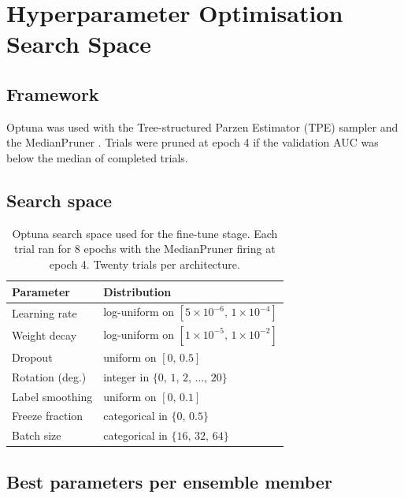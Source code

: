 \documentclass[../preamble.tex]{subfiles}
\begin{document}
\chapter{Hyperparameter Optimisation Search Space}
\label{app:hpo-search-space}

\section{Framework}
\label{app:hpo-framework}

Optuna was used with the Tree-structured Parzen Estimator (TPE) sampler and
the MedianPruner \cite{akiba2019}. Trials were pruned at epoch 4 if the
validation AUC was below the median of completed trials.

\section{Search space}
\label{app:hpo-space}

\begin{table}[htbp]
  \centering
  \small
  \caption{Optuna search space used for the fine-tune stage. Each trial ran
           for 8 epochs with the MedianPruner firing at epoch 4. Twenty trials
           per architecture.}
  \label{tab:hpo-space}
  \begin{tabular}{ll}
    \toprule
    \textbf{Parameter} & \textbf{Distribution} \\
    \midrule
    Learning rate      & log-uniform on $[5 \times 10^{-6},\, 1 \times 10^{-4}]$ \\
    Weight decay       & log-uniform on $[1 \times 10^{-5},\, 1 \times 10^{-2}]$ \\
    Dropout            & uniform on $[0,\, 0.5]$ \\
    Rotation (deg.)    & integer in $\{0,\, 1,\, 2,\, \dots,\, 20\}$ \\
    Label smoothing    & uniform on $[0,\, 0.1]$ \\
    Freeze fraction    & categorical in $\{0,\, 0.5\}$ \\
    Batch size         & categorical in $\{16,\, 32,\, 64\}$ \\
    \bottomrule
  \end{tabular}
\end{table}

\section{Best parameters per ensemble member}
\label{app:hpo-best}
\end{document}
